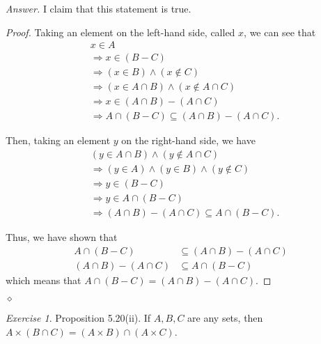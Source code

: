 \documentclass[12pt,oneside]{amsart}
\theoremstyle{remark}
\newtheorem{exer}{Exercise}
\newenvironment{answer}{\bigskip\noindent\emph{Answer.}}{\hfill$\diamond$\newline}
\begin{document}
\begin{answer}
I claim that this statement is true.

\begin{proof}
Taking an element on the left-hand side, called $x$, we can see that
\begin{align*}
&x \in A \tag{because $x \in A \cap (B - C)$} \\
&\Rightarrow  x \in (B - C) \tag{definition of $\cap$} \\
&\Rightarrow (x \in B) \wedge (x \notin C) \tag{definition of $-$} \\
&\Rightarrow (x \in A \cap B) \wedge (x \notin A \cap C) \\
&\Rightarrow x \in (A \cap B) - (A \cap C) \\
&\Rightarrow A \cap (B - C) \subseteq (A \cap B) - (A \cap C).
\end{align*}

Then, taking an element $y$ on the right-hand side, we have
\begin{align*}
&(y \in A \cap B) \wedge (y \notin A \cap C) \tag{definition of $-$} \\
&\Rightarrow (y \in A) \wedge (y \in B) \wedge (y \notin C) \tag{definition of $\cap$} \\
&\Rightarrow y \in (B - C) \\
&\Rightarrow y \in A \cap (B - C) \\
&\Rightarrow (A \cap B) - (A \cap C) \subseteq A \cap (B - C).
\end{align*}

Thus, we have shown that
\begin{align*}
A \cap (B - C) &\subseteq (A \cap B) - (A \cap C) \\
(A \cap B) - (A \cap C) &\subseteq A \cap (B - C)
\end{align*}
which means that $A \cap (B - C) = (A \cap B) - (A \cap C)$.
\end{proof}
\end{answer}

%
%
%
%
\newpage
\begin{exer}
Proposition 5.20(ii). If $A, B, C$ are any sets, then $A \times (B \cap C) = (A \times B) \cap (A \times C)$.
\end{exer}
\end{document}
